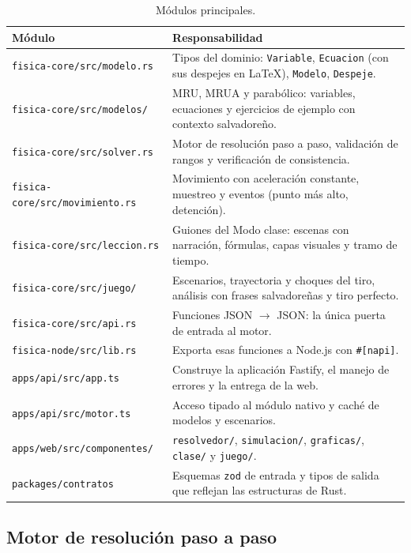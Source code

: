\documentclass[11pt,letterpaper]{article}
\begin{document}
\begin{table}[H]
\centering
\small
\begin{tabularx}{\linewidth}{@{}lX@{}}
\toprule
\textbf{Módulo} & \textbf{Responsabilidad} \\
\midrule
\texttt{fisica-core/src/modelo.rs} & Tipos del dominio: \texttt{Variable}, \texttt{Ecuacion} (con sus despejes en \LaTeX), \texttt{Modelo}, \texttt{Despeje}. \\
\texttt{fisica-core/src/modelos/} & MRU, MRUA y parabólico: variables, ecuaciones y ejercicios de ejemplo con contexto salvadoreño. \\
\texttt{fisica-core/src/solver.rs} & Motor de resolución paso a paso, validación de rangos y verificación de consistencia. \\
\texttt{fisica-core/src/movimiento.rs} & Movimiento con aceleración constante, muestreo y eventos (punto más alto, detención). \\
\texttt{fisica-core/src/leccion.rs} & Guiones del Modo clase: escenas con narración, fórmulas, capas visuales y tramo de tiempo. \\
\texttt{fisica-core/src/juego/} & Escenarios, trayectoria y choques del tiro, análisis con frases salvadoreñas y tiro perfecto. \\
\texttt{fisica-core/src/api.rs} & Funciones JSON $\to$ JSON: la única puerta de entrada al motor. \\
\texttt{fisica-node/src/lib.rs} & Exporta esas funciones a Node.js con \texttt{\#[napi]}. \\
\texttt{apps/api/src/app.ts} & Construye la aplicación Fastify, el manejo de errores y la entrega de la web. \\
\texttt{apps/api/src/motor.ts} & Acceso tipado al módulo nativo y caché de modelos y escenarios. \\
\texttt{apps/web/src/componentes/} & \texttt{resolvedor/}, \texttt{simulacion/}, \texttt{graficas/}, \texttt{clase/} y \texttt{juego/}. \\
\texttt{packages/contratos} & Esquemas \texttt{zod} de entrada y tipos de salida que reflejan las estructuras de Rust. \\
\bottomrule
\end{tabularx}
\caption{Módulos principales.}
\end{table}

\subsection{Motor de resolución paso a paso}
\end{document}
